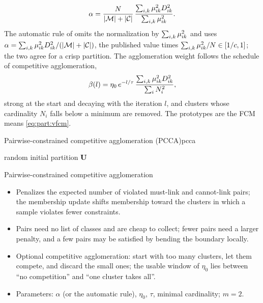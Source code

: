 \begin{equation*}
  \alpha=\frac{N}{|\mathcal{M}|+|\mathcal{C}|}\,\frac{\sum_{i,k}\mu_{ik}^2D^2_{ik}}{\sum_{i,k}\mu_{ik}^2}.
\end{equation*}
The automatic rule of  omits the normalization by $\sum_{i,k}\mu_{ik}^2$ and uses $\alpha=\sum_{i,k}\mu_{ik}^2D^2_{ik}/(|\mathcal{M}|+|\mathcal{C}|)$, the published value times $\sum_{i,k}\mu_{ik}^2/N\in[1/c,1]$; the two agree for a crisp partition. The agglomeration weight follows the schedule of competitive agglomeration,
\begin{equation}
  \beta(l)=\eta_0\,e^{-l/\tau}\,\frac{\sum_{i,k}\mu_{ik}^2D^2_{ik}}{\sum_i N_i^2},
  \label{eq:beyond:beta}
\end{equation}
strong at the start and decaying with the iteration $l$, and clusters whose cardinality $N_i$ falls below a minimum are removed. The prototypes are the FCM means \eqref{eq:part:vfcm}.

\begin{algobox}{Pairwise-constrained competitive agglomeration (PCCA)}{pcca}
\begin{algorithm}[H]
random initial partition $\mathbf{U}$\;
\end{algorithm}
\end{algobox}
\begin{summarybox}{Pairwise-constrained competitive agglomeration}
\begin{itemize}
  \item Penalizes the expected number of violated must-link and cannot-link pairs; the membership update shifts membership toward the clusters in which a sample violates fewer constraints.
  \item Pairs need no list of classes and are cheap to collect; fewer pairs need a larger penalty, and a few pairs may be satisfied by bending the boundary locally.
  \item Optional competitive agglomeration: start with too many clusters, let them compete, and discard the small ones; the usable window of $\eta_0$ lies between ``no competition'' and ``one cluster takes all''.
  \item Parameters: $\alpha$ (or the automatic rule), $\eta_0$, $\tau$, minimal cardinality; $m=2$.
\end{itemize}
\end{summarybox}

